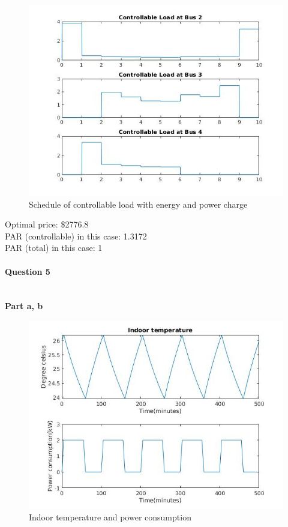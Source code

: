 \documentclass[11pt]{article}
\begin{document}
\begin{figure}[H]
    \centering
    \includegraphics[scale=0.6]{figs/q4.jpg}
    \caption{Schedule of controllable load with energy and power charge}
    \label{fig::q4}
\end{figure}

\noindent
Optimal price: \$2776.8   \\
PAR (controllable) in this case: 1.3172    \\
PAR (total) in this case: 1


\pagebreak
\paragraph{Question 5} \mbox{} \\
\textbf{Part a, b} \\
\begin{figure}[H]
    \centering
    \includegraphics[scale=0.5]{figs/q5_a.jpg}
    \caption{Indoor temperature and power consumption}
    \label{fig::q5a}
\end{figure}
\end{document}
